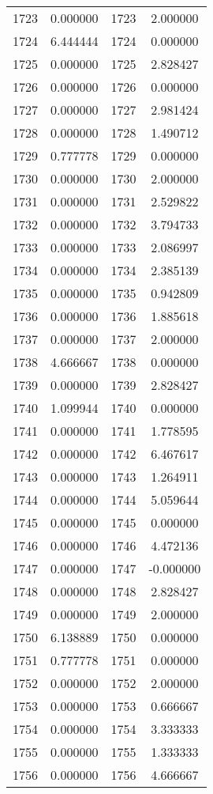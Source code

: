 \documentclass[12pt]{article}
\begin{document}
\begin{longtable}{@{}cccc@{}}
1723 & 0.000000 & 1723 & 2.000000 \\
1724 & 6.444444 & 1724 & 0.000000 \\
1725 & 0.000000 & 1725 & 2.828427 \\
1726 & 0.000000 & 1726 & 0.000000 \\
1727 & 0.000000 & 1727 & 2.981424 \\
1728 & 0.000000 & 1728 & 1.490712 \\
1729 & 0.777778 & 1729 & 0.000000 \\
1730 & 0.000000 & 1730 & 2.000000 \\
1731 & 0.000000 & 1731 & 2.529822 \\
1732 & 0.000000 & 1732 & 3.794733 \\
1733 & 0.000000 & 1733 & 2.086997 \\
1734 & 0.000000 & 1734 & 2.385139 \\
1735 & 0.000000 & 1735 & 0.942809 \\
1736 & 0.000000 & 1736 & 1.885618 \\
1737 & 0.000000 & 1737 & 2.000000 \\
1738 & 4.666667 & 1738 & 0.000000 \\
1739 & 0.000000 & 1739 & 2.828427 \\
1740 & 1.099944 & 1740 & 0.000000 \\
1741 & 0.000000 & 1741 & 1.778595 \\
1742 & 0.000000 & 1742 & 6.467617 \\
1743 & 0.000000 & 1743 & 1.264911 \\
1744 & 0.000000 & 1744 & 5.059644 \\
1745 & 0.000000 & 1745 & 0.000000 \\
1746 & 0.000000 & 1746 & 4.472136 \\
1747 & 0.000000 & 1747 & -0.000000 \\
1748 & 0.000000 & 1748 & 2.828427 \\
1749 & 0.000000 & 1749 & 2.000000 \\
1750 & 6.138889 & 1750 & 0.000000 \\
1751 & 0.777778 & 1751 & 0.000000 \\
1752 & 0.000000 & 1752 & 2.000000 \\
1753 & 0.000000 & 1753 & 0.666667 \\
1754 & 0.000000 & 1754 & 3.333333 \\
1755 & 0.000000 & 1755 & 1.333333 \\
1756 & 0.000000 & 1756 & 4.666667 \\

\end{longtable}
\end{document}
